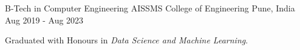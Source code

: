 

\begin{cventries}

  \cventry
    {B-Tech in Computer Engineering} %
    {AISSMS College of Engineering} %
    {Pune, India} %
    {Aug 2019 - Aug 2023} %
    {
      \begin{cvitems} %
        \item {Graduated with Honours in \textit{Data Science and Machine Learning}.\hfill{}}
      \end{cvitems}
    }
\end{cventries}
